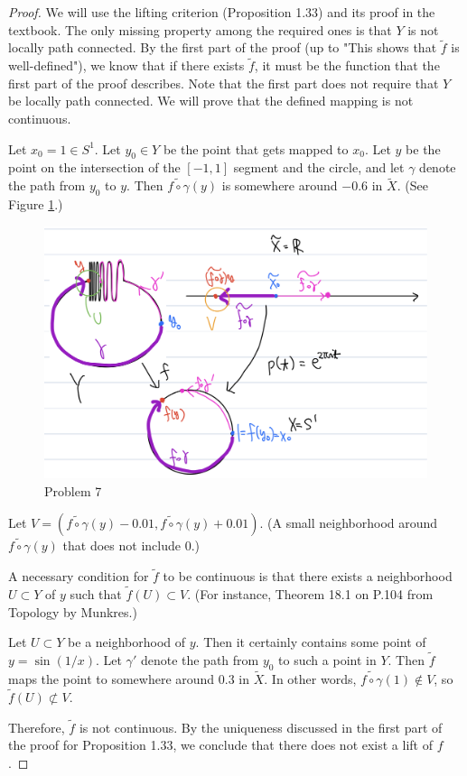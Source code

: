 \documentclass[12pt, psamsfonts]{amsart}
\theoremstyle{definition}
\theoremstyle{remark}
\numberwithin{equation}{section}
\begin{document}
\begin{proof}
  We will use the lifting criterion (Proposition 1.33) and its proof in the textbook.
  The only missing property among the required ones is that $Y$ is not locally path connected.
  By the first part of the proof (up to "This shows that $\tilde{f}$ is well-defined"), we know that if there exists $\tilde{f}$, it must be the function that the first part of the proof describes.
  Note that the first part does not require that $Y$ be locally path connected.
  We will prove that the defined mapping is not continuous.

  Let $x_0 = 1 \in S^1$.
  Let $y_0 \in Y$ be the point that gets mapped to $x_0$.
  Let $y$ be the point on the intersection of the $[-1, 1]$ segment and the circle, and let $\gamma$ denote the path from $y_0$ to $y$.
  Then $\widetilde{f \circ \gamma}(y)$ is somewhere around $-0.6$ in $\tilde{X}$.
  (See Figure \ref{fig:problem7}.)
  \begin{figure}
    \includegraphics[width=.5\linewidth]{problem7.jpeg}
    \caption{Problem 7}
    \label{fig:problem7}
  \end{figure}
  Let $V = (\widetilde{f \circ \gamma}(y) - 0.01, \widetilde{f \circ \gamma}(y) + 0.01)$.
  (A small neighborhood around $\widetilde{f \circ \gamma}(y)$ that does not include $0$.)

  A necessary condition for $\tilde{f}$ to be continuous is that there exists a neighborhood $U \subset Y$ of $y$ such that $\tilde{f}(U) \subset V$.
  (For instance, Theorem 18.1 on P.104 from Topology by Munkres.)

  Let $U \subset Y$ be a neighborhood of $y$.
  Then it certainly contains some point of $y = \sin (1/x)$.
  Let $\gamma'$ denote the path from $y_0$ to such a point in $Y$.
  Then $\tilde{f}$ maps the point to somewhere around $0.3$ in $\tilde{X}$.
  In other words, $\widetilde{f \circ \gamma}(1) \notin V$, so $\tilde{f}(U) \not\subset V$.

  Therefore, $\tilde{f}$ is not continuous.
  By the uniqueness discussed in the first part of the proof for Proposition 1.33, we conclude that there does not exist a lift of $f$.
\end{proof}
\end{document}
